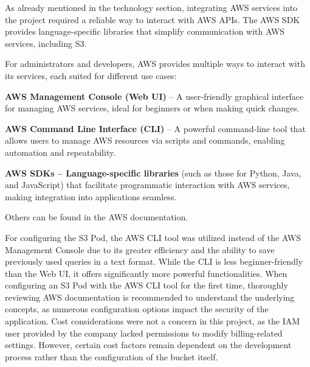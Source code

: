 As already mentioned in the technology section, integrating AWS services into the project required a reliable way to interact with AWS APIs. The AWS SDK provides language-specific libraries that simplify communication with AWS services, including S3.

For administrators and developers, AWS provides multiple ways to interact with its services, each suited for different use cases:
\begin{compactitem}
\item \textbf{AWS Management Console (Web UI)} – A user-friendly graphical interface for managing AWS services, ideal for beginners or when making quick changes.
\item \textbf{AWS Command Line Interface (CLI)} – A powerful command-line tool that allows users to manage AWS resources via scripts and commands, enabling automation and repeatability.
\item \textbf{AWS SDKs – Language-specific libraries} (such as those for Python, Java, and JavaScript) that facilitate programmatic interaction with AWS services, making integration into applications seamless.
\item Others can be found in the AWS documentation.
\end{compactitem}

For configuring the S3 Pod, the AWS CLI tool was utilized instead of the AWS Management Console due to its greater efficiency and the ability to save previously used queries in a text format. While the CLI is less beginner-friendly than the Web UI, it offers significantly more powerful functionalities. When configuring an S3 Pod with the AWS CLI tool for the first time, thoroughly reviewing AWS documentation is recommended to understand the underlying concepts, as numerous configuration options impact the security of the application. Cost considerations were not a concern in this project, as the IAM user provided by the company lacked permissions to modify billing-related settings. However, certain cost factors remain dependent on the development process rather than the configuration of the bucket itself.

